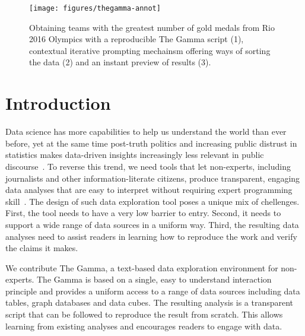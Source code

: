 \documentclass[manuscript,review,anonymous]{acmart}
\begin{document}
\maketitle

\begin{figure}
\texttt{[image: figures/thegamma-annot]}
\vspace{-0.5em}
\caption{Obtaining teams with the greatest number of gold medals from Rio 2016
Olympics with a reproducible The Gamma script (1), contextual iterative prompting mechainsm
offering ways of sorting the data (2) and an instant preview of results (3).}
\label{fig:thegamma}
\vspace{-0.5em}
\end{figure}


\section{Introduction}
Data science has more capabilities to help us understand the world than ever before, yet at the
same time post-truth politics and increasing public distrust in statistics makes data-driven insights
increasingly less relevant in public discourse~\cite{howstatslost}. To reverse this trend, we
need tools that let non-experts, including journalists and other information-literate citizens,
produce transparent, engaging data analyses that are easy to interpret without requiring expert
programming skill~\cite{ddj}. The design of such data exploration tool poses a unique mix of chellenges.
First, the tool needs to have a very low barrier to entry. Second, it needs to support a wide
range of data sources in a uniform way. Third, the resulting data analyses need to assist
readers in learning how to reproduce the work and verify the claims it makes.

We contribute The Gamma, a text-based data exploration environment for non-experts. The Gamma
is based on a single, easy to understand interaction principle and provides a uniform
access to a range of data sources including data tables, graph databases and data cubes.
The resulting analysis is a transparent script that can be followed to reproduce the
result from scratch. This allows learning from existing analyses and encourages readers
to engage with data.
\end{document}
